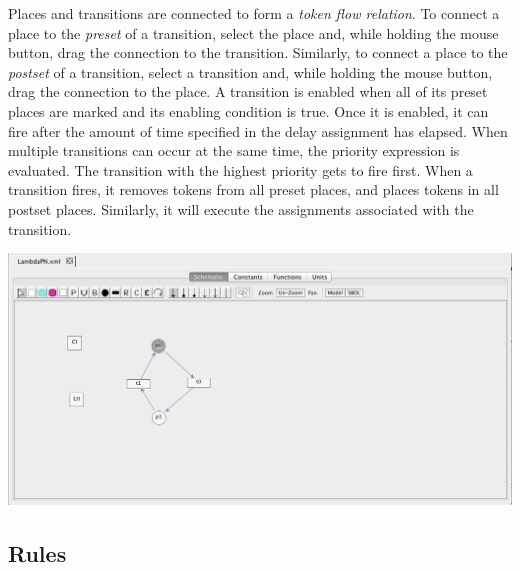 \documentclass[titlepage,11pt]{article}
\begin{document}
Places and transitions are connected to form a \emph{token flow relation}.  To connect a place to the \emph{preset} of a transition, select the place and, while holding the mouse button, drag the connection to the transition.  Similarly, to connect a place to the \emph{postset} of a transition, select a transition and, while holding the mouse button, drag the connection to the place.  A transition is enabled when all of its preset places are marked and its enabling condition is true. Once it is enabled, it can fire after the amount of time specified in the delay assignment has elapsed.  When multiple transitions can occur at the same time, the priority expression is evaluated.  The transition with the highest priority gets to fire first.  When a transition fires, it removes tokens from all preset places, and places tokens in all postset places.  Similarly, it will execute the assignments associated with the transition.

\begin{center}
\includegraphics[width=160mm]{screenshots/flowRelation}
\end{center}

\subsection{\label{Rules}Rules}


\end{document}
